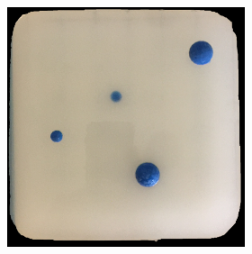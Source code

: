 \documentclass[]{interact}
\theoremstyle{plain}%
\theoremstyle{definition}
\theoremstyle{remark}
\begin{document}
\begin{figure}[]
	\centering
	\begin{subfigure}[b]{0.48\textwidth}
		\begin{subfigure}[b]{.7\textwidth}
			\includegraphics[width=\textwidth]{./figs/phantom.jpg}
		\end{subfigure} 
		\vspace{0.025\textwidth}
		\begin{subfigure}[b]{.2\textwidth}

\end{subfigure}
\end{subfigure}
\end{figure}
\end{document}
